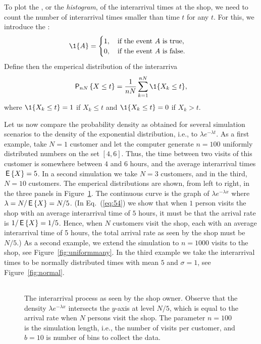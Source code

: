 To plot the , or the
\emph{histogram}, of the interarrival times at the shop, we need to count the
number of interarrival times smaller than time $t$ for any $t$.  For
this, we introduce the :
\begin{equation*}
  \1{A} =
  \begin{cases}
    1, \quad\text{if the event $A$ is true},\\
    0, \quad\text{if the event $A$ is false}.
  \end{cases}
\end{equation*}
Define then the emperical distribution of the
interarriva
\begin{equation*}
  \P{X \leq t}_{nN} = \frac1{nN}\sum_{k=1}^{nN} \1{X_k\leq t},
\end{equation*}
where $\1{X_k\leq t}=1$ if $X_k\leq t$ and $\1{X_k\leq t}=0$
if $X_k> t$.  

Let us now compare the probability density as
obtained for several simulation scenarios to the density of the
exponential distribution, i.e., to $\lambda e^{-\lambda t}$.  As a
first example, take $N=1$ customer and let the computer generate
$n=100$ uniformly distributed numbers on the set $[4, 6]$.  Thus, the
time between two visits of this customer is somewhere between $4$ and
$6$ hours, and the average interarrival times $\,\mathsf{E}\left\{X\right\} = 5$. In a second
simulation we take $N=3$ customers, and in the third, $N=10$
customers. The emperical distributions are shown, from left to right,
in the three panels in Figure~\ref{fig:uniformfew}. The continuous
curve is the graph of $\lambda e^{-\lambda x}$ where
$\lambda = N/\,\mathsf{E}\left\{X\right\} = N/5$. (In Eq.~(\ref{eq:54}) we show that when $1$
person visits the shop  with an average interarrival time of $5$
hours, it must be that the arrival rate  is $1/\,\mathsf{E}\left\{X\right\} = 1/5$. Hence, when $N$ customers visit the shop, each with an average interarrival time of 5 hours, the total arrival rate as seen by the shop must be $N/5$.)  As a second
example, we extend the simulation to $n=1000$ visits to the shop, see
Figure~\ref{fig:uniformmany}. In the third example we take the
interarrival times to be normally distributed times with mean $5$ and
$\sigma=1$, see Figure~\ref{fig:normal}.

\begin{figure}[ht]
  \centering
  \begin{tabular}[h]{c}
 \\
  \end{tabular}
  \caption{The interarrival process as seen by the shop owner. Observe
    that the density $\lambda e^{-\lambda x}$ intersects the $y$-axis
    at level $N/5$, which is equal to the arrival rate when $N$
    persons visit the shop. The parameter $n=100$ is the simulation
    length, i.e., the number of visits per customer, and $b=10$ is
    number of bins to collect the data.}
  \label{fig:uniformfew}
\end{figure}

